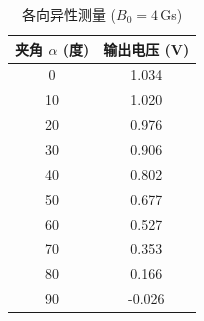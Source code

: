 \documentclass[11pt]{ctexart}
\makeatletter
\newcommand{\boxspacing}{\kern\kvtcb@left@rule\kern\kvtcb@boxsep}
\newcommand{\prompt}[4]{
        {\ttfamily\llap{{\color{#2}[#3]:\hspace{3pt}#4}}\vspace{-\baselineskip}}
    }
\makeatother
\begin{document}
            \begin{tcolorbox}[breakable, size=fbox, boxrule=.5pt, pad at break*=1mm, opacityfill=0]
\prompt{Out}{outcolor}{49}{\boxspacing}
\begin{table}[H]
\centering
\caption{各向异性测量 ($B_0=4$\,Gs)}
\label{tab:anisotropy}
\begin{tabular}{c c}
\toprule
夹角 $\alpha$ (度) & 输出电压 (V) \\
\midrule
0  & 1.034 \\
10 & 1.020 \\
20 & 0.976 \\
30 & 0.906 \\
40 & 0.802 \\
50 & 0.677 \\
60 & 0.527 \\
70 & 0.353 \\
80 & 0.166 \\
90 & -0.026 \\
\bottomrule
\end{tabular}
\end{table}
\end{tcolorbox}
\end{document}
